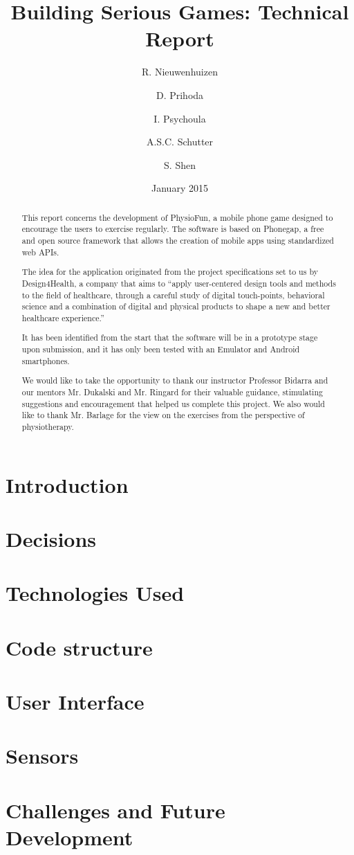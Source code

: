 \documentclass[a4paper]{article}
\title{Building Serious Games: Technical Report}
\author{
	R. Nieuwenhuizen \and
    D. Prihoda  \and
	I. Psychoula \and
	A.S.C. Schutter \and
	S. Shen
 }
\date{January 2015}
\begin{document}
\maketitle
\begin{abstract}
This report concerns the development of PhysioFun, a mobile phone game designed to encourage the users to exercise regularly. The software is based on Phonegap, a free and open source framework that allows the creation of mobile apps using standardized web APIs. 

The idea for the application originated from the project specifications set to us by Design4Health, a company that aims to ``apply user-centered design tools and methods to the field of healthcare, through a careful study of digital touch-points, behavioral science and a combination of digital and physical products to shape a new and better healthcare experience.''

It has been identified from the start that the software will be in a prototype stage upon submission, and it has only been tested with an Emulator and Android smartphones.
\end{abstract}

\renewcommand{\abstractname}{Acknowledgements}
\begin{abstract}
We would like to take the opportunity to thank our instructor Professor Bidarra and our mentors Mr. Dukalski and Mr. Ringard for their valuable guidance, stimulating suggestions and encouragement that helped us complete this project. We also would like to thank Mr. Barlage for the view on the exercises from the perspective of physiotherapy. 
\end{abstract}

\section{Introduction}


\section{Decisions}


\section{Technologies Used}


\section{Code structure}


\section{User Interface}


\section{Sensors}


\section{Challenges and Future Development}

\end{document}
